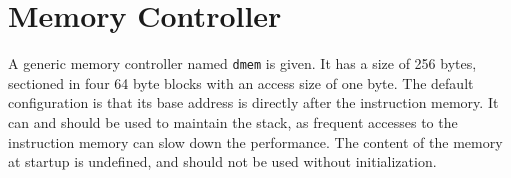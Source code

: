 \section{Memory Controller}
\label{sec:memoryctrl}
A generic memory controller named \verb=dmem= is given.
It has a size of 256 bytes, sectioned in four 64 byte blocks with an access size of one byte.
The default configuration is that its base address is directly after the instruction memory.
It can and should be used to maintain the stack, as frequent accesses to the instruction memory can slow down the performance.
The content of the memory at startup is undefined, and should not be used without initialization.